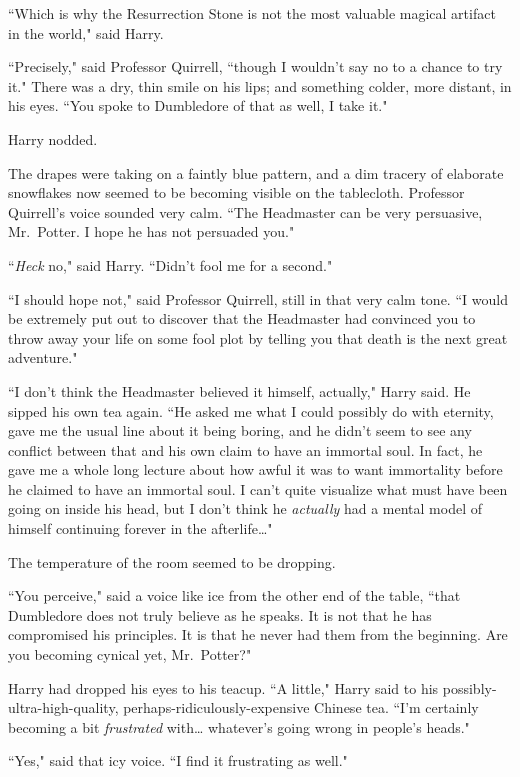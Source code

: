 ``Which is why the Resurrection Stone is not the most valuable magical artifact in the world," said Harry.

``Precisely," said Professor Quirrell, ``though I wouldn't say no to a chance to try it." There was a dry, thin smile on his lips; and something colder, more distant, in his eyes. ``You spoke to Dumbledore of that as well, I take it."

Harry nodded.

The drapes were taking on a faintly blue pattern, and a dim tracery of elaborate snowflakes now seemed to be becoming visible on the tablecloth. Professor Quirrell's voice sounded very calm. ``The Headmaster can be very persuasive, Mr.~Potter. I hope he has not persuaded you."

``\emph{Heck} no," said Harry. ``Didn't fool me for a second."

``I should hope not," said Professor Quirrell, still in that very calm tone. ``I would be extremely put out to discover that the Headmaster had convinced you to throw away your life on some fool plot by telling you that death is the next great adventure."

``I don't think the Headmaster believed it himself, actually," Harry said. He sipped his own tea again. ``He asked me what I could possibly do with eternity, gave me the usual line about it being boring, and he didn't seem to see any conflict between that and his own claim to have an immortal soul. In fact, he gave me a whole long lecture about how awful it was to want immortality before he claimed to have an immortal soul. I can't quite visualize what must have been going on inside his head, but I don't think he \emph{actually} had a mental model of himself continuing forever in the afterlife{\ldots}"

The temperature of the room seemed to be dropping.

``You perceive," said a voice like ice from the other end of the table, ``that Dumbledore does not truly believe as he speaks. It is not that he has compromised his principles. It is that he never had them from the beginning. Are you becoming cynical yet, Mr.~Potter?"

Harry had dropped his eyes to his teacup. ``A little," Harry said to his possibly-ultra-high-quality, perhaps-ridiculously-expensive Chinese tea. ``I'm certainly becoming a bit \emph{frustrated} with{\ldots} whatever's going wrong in people's heads."

``Yes," said that icy voice. ``I find it frustrating as well."

